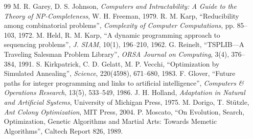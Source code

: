 \documentclass[12pt,a4paper]{report}
\begin{document}
\begin{thebibliography}{99}
 M. R. Garey, D. S. Johnson, \textit{Computers and Intractability: A Guide to the Theory of NP-Completeness}, W. H. Freeman, 1979.
 R. M. Karp, ``Reducibility among combinatorial problems'', \textit{Complexity of Computer Computations}, pp. 85--103, 1972.
 M. Held, R. M. Karp, ``A dynamic programming approach to sequencing problems'', \textit{J. SIAM}, 10(1), 196--210, 1962.
 G. Reinelt, ``TSPLIB---A Traveling Salesman Problem Library'', \textit{ORSA Journal on Computing}, 3(4), 376--384, 1991.
 S. Kirkpatrick, C. D. Gelatt, M. P. Vecchi, ``Optimization by Simulated Annealing'', \textit{Science}, 220(4598), 671--680, 1983.
 F. Glover, ``Future paths for integer programming and links to artificial intelligence'', \textit{Computers \& Operations Research}, 13(5), 533--549, 1986.
 J. H. Holland, \textit{Adaptation in Natural and Artificial Systems}, University of Michigan Press, 1975.
 M. Dorigo, T. Stützle, \textit{Ant Colony Optimization}, MIT Press, 2004.
 P. Moscato, ``On Evolution, Search, Optimization, Genetic Algorithms and Martial Arts: Towards Memetic Algorithms'', Caltech Report 826, 1989.
\end{thebibliography}
\end{document}
